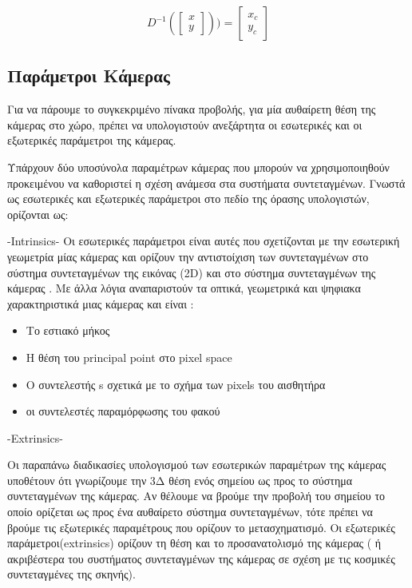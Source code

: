 \begin{equation}
D^{-1}
\left (
\begin{bmatrix}
x\\
y  
\end{bmatrix}
\right )
)=
\begin{bmatrix}
x_{c}\\
y_{c}
\end{bmatrix}
\end{equation} 








\subsection{Παράμετροι Κάμερας}

Για να πάρουμε το συγκεκριμένο πίνακα προβολής, για μία αυθαίρετη θέση της κάμερας στο χώρο, πρέπει να υπολογιστούν ανεξάρτητα οι εσωτερικές και οι εξωτερικές παράμετροι της κάμερας. 


Υπάρχουν δύο υποσύνολα παραμέτρων κάμερας που μπορούν να χρησιμοποιηθούν προκειμένου να καθοριστεί η σχέση ανάμεσα στα συστήματα συντεταγμένων.
Γνωστά ως εσωτερικές και εξωτερικές παράμετροι στο πεδίο της όρασης υπολογιστών, ορίζονται ως:



-Intrinsics-
Οι εσωτερικές παράμετροι είναι αυτές που σχετίζονται με την εσωτερική γεωμετρία μίας κάμερας και ορίζουν την αντιστοίχιση των συντεταγμένων στο σύστημα συντεταγμένων της εικόνας (2D) και στο σύστημα συντεταγμένων της κάμερας \cite{Malik2002}. Με άλλα λόγια αναπαριστούν τα οπτικά, γεωμετρικά και ψηφιακα χαρακτηριστικά μιας κάμερας και είναι :

\begin{itemize}
\item Το εστιακό μήκος
\item Η θέση του principal point στο pixel space
\item Ο συντελεστής s σχετικά με το σχήμα των pixels του αισθητήρα
\item οι συντελεστές παραμόρφωσης του φακού
\end{itemize}




-Extrinsics-

Οι παραπάνω διαδικασίες υπολογισμού των εσωτερικών παραμέτρων της κάμερας υποθέτουν ότι γνωρίζουμε την 3Δ θέση ενός σημείου ως προς το σύστημα συντεταγμένων της κάμερας. Αν θέλουμε να βρούμε την προβολή του σημείου το οποίο ορίζεται ως προς ένα αυθαίρετο σύστημα συντεταγμένων, τότε πρέπει να βρούμε τις εξωτερικές παραμέτρους που ορίζουν το μετασχηματισμό. Οι εξωτερικές παράμετροι(extrinsics) ορίζουν τη θέση και το προσανατολισμό της κάμερας ( ή ακριβέστερα του συστήματος συντεταγμένων της κάμερας σε σχέση με τις κοσμικές συντεταγμένες της σκηνής). 

